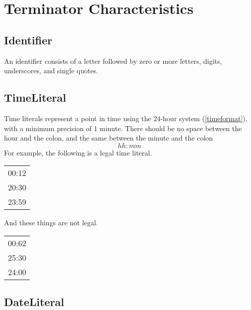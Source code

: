 \section{Terminator Characteristics}
\subsection{Identifier}\label{Identifier}
An identifier consists of a letter followed by zero or more letters, digits, underscores, and single quotes.
\begin{grammar}
    \emptyStm
        \orStm{\texttt{[0-9]}}
\end{grammar}

\subsection{TimeLiteral}\label{TimeLiteral}
Time literals represent a point in time using the 24-hour system (\ref{timeformat}), with a minimum precision of 1 minute.
There should be no space between the hour and the colon, and the same between the minute and the colon
\begin{equation}\label{timeformat}
    hh:mm
\end{equation}
For example, the following is a legal time literal.

\begin{center}
    \begin{tabular}{c}
        00:12 \\
        20:30 \\
        23:59 \\
    \end{tabular}
\end{center}
And these things are not legal.

\begin{center}
    \begin{tabular}{c}
        00:62 \\
        25:30 \\
        24:00 \\
    \end{tabular}
\end{center}

\subsection{DateLiteral}\label{DateLiteral}

